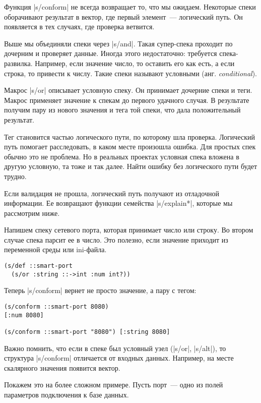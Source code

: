 Функция \spverb|s/conform| не всегда возвращает то, что мы ожидаем. Некоторые
спеки оборачивают результат в вектор, где первый элемент~--- логический путь. Он
появляется в тех случаях, где проверка ветвится.

Выше мы объединяли спеки через \spverb|s/and|. Такая супер-спека проходит по
дочерним и проверяет данные. Иногда этого недостаточно: требуется
спека-развилка. Например, если значение число, то оставить его как есть, а если
строка, то привести к числу. Такие спеки называют условными (анг. \emph{conditional}).

Макрос \spverb|s/or| описывает условную спеку. Он принимает дочерние спеки и
теги. Макрос применяет значение к спекам до первого удачного случая. В
результате получим пару из нового значения и тега той спеки, что дала
положительный результат.

Тег становится частью логического пути, по которому шла проверка. Логический
путь помогает расследовать, в каком месте произошла ошибка. Для простых спек
обычно это не проблема. Но в реальных проектах условная спека вложена в другую
условную, та тоже и так далее. Найти ошибку без логического пути будет трудно.

Если валидация не прошла, логический путь получают из отладочной информации. Ее
возвращают функции семейства \spverb|s/explain*|, которые мы рассмотрим ниже.

Напишем спеку сетевого порта, которая принимает число или строку. Во втором
случае спека парсит ее в число. Это полезно, если значение приходит из
переменной среды или ini-файла.

\begin{verbatim}
(s/def ::smart-port
  (s/or :string ::->int :num int?))
\end{verbatim}

Теперь \spverb|s/conform| вернет не просто значение, а пару с тегом:

\begin{verbatim}
(s/conform ::smart-port 8080)
[:num 8080]

(s/conform ::smart-port "8080") [:string 8080]
\end{verbatim}


Важно помнить, что если в спеке был условный узел (\spverb|s/or|, \spverb|s/alt|), то
структура \spverb|s/conform| отличается от входных данных. Например, на месте
скалярного значения появится вектор.

Покажем это на более сложном примере. Пусть порт~--- одно из полей параметров
подключения к базе данных.

